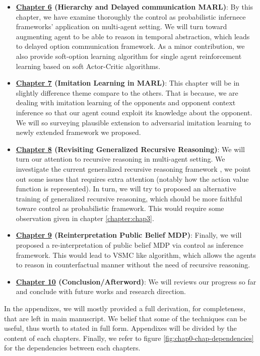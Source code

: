 \begin{itemize}
    \item \textbf{\hyperref[chapter:chap6]{Chapter 6} (Hierarchy and Delayed communication MARL)}: By this chapter, we have examine thoroughly the control as probabilistic infernece frameworks' application on multi-agent setting. We will turn toward augmenting agent to be able to reason in temporal abstraction, which leads to delayed option communication framework. As a minor contribution, we also provide soft-option learning algorithm for single agent reinforcement learning based on soft Actor-Critic algorithms.
    \item \textbf{\hyperref[chapter:chap7]{Chapter 7} (Imitation Learning in MARL)}: This chapter will be in slightly difference theme compare to the others. That is because, we are dealing with imitation learning of the opponents and opponent context inference so that our agent cound exploit its knowledge about the opponent. We will so surveying plausible extension to adversarial imitation learning to newly extended framework we proposed. 
    \item \textbf{\hyperref[chapter:chap8]{Chapter 8} (Revisiting Generalized Recursive Reasoning)}: We will turn our attention to recursive reasoning in multi-agent setting. We investigate the current generalized recursive reasoning framework \cite{wen2019multi}, we point out some issues that requires extra attention (notably how the action value function is represented). In turn, we will try to proposed an alternative training of generalized recursive reasoning, which should be more faithful toware control as probabilistic framework. This would require some observation given in chapter \ref{chapter:chap3}. 
    \item \textbf{\hyperref[chapter:chap9]{Chapter 9} (Reinterpretation Public Belief MDP)}: Finally, we will proposed a re-interpretation of public belief MDP via control as inference framework. This would lead to VSMC like algorithm, which allows the agents to reason in counterfactual manner without the need of recursive reasoning.
    \item \textbf{\hyperref[chapter:chap10]{Chapter 10} (Conclusion/Afterword)}: We will reviews our progress so far and conclude with future works and  research direction. 
\end{itemize}
In the appendixes, we will mostly provided a full derivation, for completeness, that are left in main manuscript. We belief that some of the techniques can be useful, thus worth to stated in full form. Appendixes will be divided by the content of each chapters. Finally, we refer to figure \ref{fig:chap0-chap-dependencies} for the dependencies between each chapters.